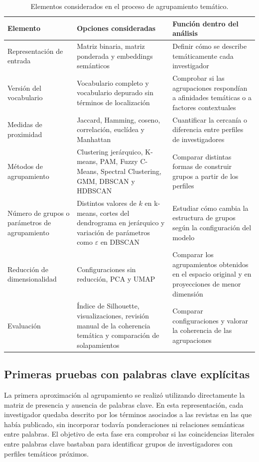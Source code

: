 \documentclass[11pt,spanish,listoffigures,listoftables]{tfgetsinf}
\begin{document}
\begin{table}[H]
\centering
\small
\renewcommand{\arraystretch}{1.05}
\begin{tabular}{
>{\centering\arraybackslash}m{}
m{}
m{}
}
\hline
\textbf{Elemento} & \textbf{Opciones consideradas} & \textbf{Función dentro del análisis} \\
\hline
Representación de entrada & Matriz binaria, matriz ponderada y embeddings semánticos & Definir cómo se describe temáticamente cada investigador \\
\hline
Versión del vocabulario & Vocabulario completo y vocabulario depurado sin términos de localización & Comprobar si las agrupaciones respondían a afinidades temáticas o a factores contextuales \\
\hline
Medidas de proximidad & Jaccard, Hamming, coseno, correlación, euclídea y Manhattan & Cuantificar la cercanía o diferencia entre perfiles de investigadores \\
\hline
Métodos de agrupamiento & Clustering jerárquico, K-means, PAM, Fuzzy C-Means, Spectral Clustering, GMM, DBSCAN y HDBSCAN & Comparar distintas formas de construir grupos a partir de los perfiles \\
\hline
Número de grupos o parámetros de agrupamiento & Distintos valores de \(k\) en k-means, cortes del dendrograma en jerárquico y variación de parámetros como \(\varepsilon\) en DBSCAN & Estudiar cómo cambia la estructura de grupos según la configuración del modelo \\
\hline
Reducción de dimensionalidad & Configuraciones sin reducción, PCA y UMAP & Comparar los agrupamientos obtenidos en el espacio original y en proyecciones de menor dimensión \\
\hline
Evaluación & Índice de Silhouette, visualizaciones, revisión manual de la coherencia temática y comparación de solapamientos & Comparar configuraciones y valorar la coherencia de las agrupaciones \\
\hline
\end{tabular}
\caption{Elementos considerados en el proceso de agrupamiento temático.}
\label{tab:elementos_clustering}
\end{table}

\subsection{Primeras pruebas con palabras clave explícitas}

La primera aproximación al agrupamiento se realizó utilizando directamente la matriz de presencia y ausencia de palabras clave. En esta representación, cada investigador quedaba descrito por los términos asociados a las revistas en las que había publicado, sin incorporar todavía ponderaciones ni relaciones semánticas entre palabras. El objetivo de esta fase era comprobar si las coincidencias literales entre palabras clave bastaban para identificar grupos de investigadores con perfiles temáticos próximos.
\end{document}
